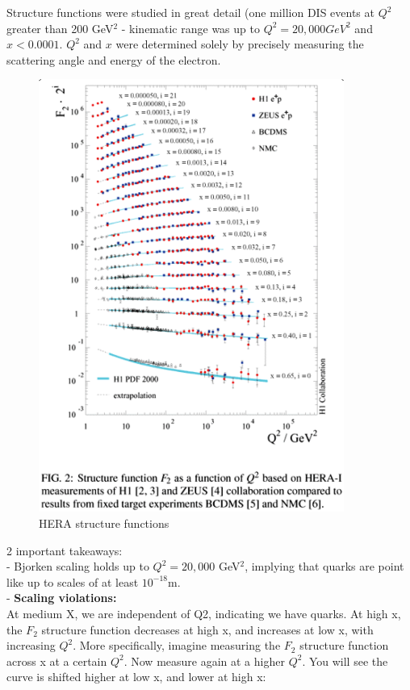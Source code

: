     
        
        Structure functions were studied in great detail (one million DIS events at $Q^2$ greater than 200 GeV$^2$ - kinematic range was up to $Q^2 = 20,000 GeV^2$ and $x < 0.0001$. $Q^2$ and $x$ were determined solely by precisely measuring the scattering angle and energy of the electron. 
        
        \begin{figure}[H]
            \centering
            \includegraphics[width=10cm]{Chapters/Ch1-Intro/Ch1-Sec1-Background/pics/inelastic-ep/Hera-dis.PNG}
            \caption{HERA structure functions}
        \end{figure}
        
        2 important takeaways:\\
        - Bjorken scaling holds up to $Q^2 = 20,000$ GeV$^2$, implying that quarks are point like up to scales of at least $10^{-18}$m. \\
        - \textbf{Scaling violations: }\\
        \newline
        \indent At medium X, we are independent of Q2, indicating we have quarks. At high x, the $F_2$ structure function decreases at high x, and increases at low x, with increasing $Q^2$. More specifically, imagine measuring the $F_2$ structure function across x at a certain $Q^2$. Now measure again at a higher $Q^2$. You will see the curve is shifted higher at low x, and lower at high x:
        
